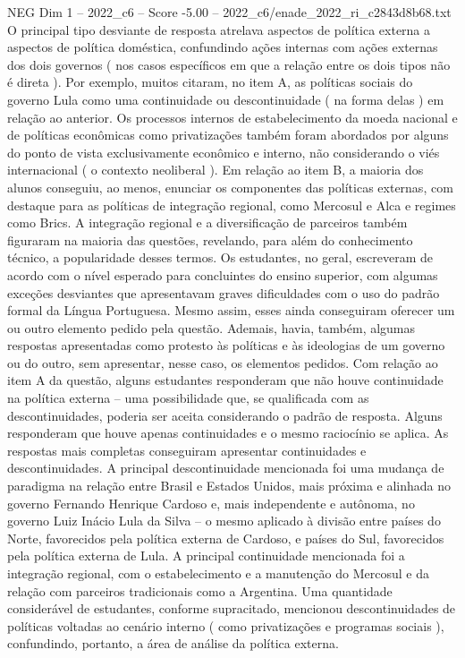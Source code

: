\begin{textsample}{NEG Dim 1 – 2022\_c6 – Score -5.00 – 2022\_c6/enade\_2022\_ri\_c2843d8b68.txt}
O principal tipo desviante de resposta atrelava aspectos de política externa a aspectos de política doméstica, confundindo ações internas com ações externas dos dois governos ( nos casos específicos em que a relação entre os dois tipos não é direta ).
Por exemplo, muitos citaram, no item A, as políticas sociais do governo Lula como uma continuidade ou descontinuidade ( na forma delas ) em relação ao anterior.
Os processos internos de estabelecimento da moeda nacional e de políticas econômicas como privatizações também foram abordados por alguns do ponto de vista exclusivamente econômico e interno, não considerando o viés internacional ( o contexto neoliberal ).
Em relação ao item B, a maioria dos alunos conseguiu, ao menos, enunciar os componentes das políticas externas, com destaque para as políticas de integração regional, como Mercosul e Alca e regimes como Brics.
A integração regional e a diversificação de parceiros também figuraram na maioria das questões, revelando, para além do conhecimento técnico, a popularidade desses termos.
Os estudantes, no geral, escreveram de acordo com o nível esperado para concluintes do ensino superior, com algumas exceções desviantes que apresentavam graves dificuldades com o uso do padrão formal da Língua Portuguesa.
Mesmo assim, esses ainda conseguiram oferecer um ou outro elemento pedido pela questão.
Ademais, havia, também, algumas respostas apresentadas como protesto às políticas e às ideologias de um governo ou do outro, sem apresentar, nesse caso, os elementos pedidos.
Com relação ao item A da questão, alguns estudantes responderam que não houve continuidade na política externa – uma possibilidade que, se qualificada com as descontinuidades, poderia ser aceita considerando o padrão de resposta.
Alguns responderam que houve apenas continuidades e o mesmo raciocínio se aplica.
As respostas mais completas conseguiram apresentar continuidades e descontinuidades.
A principal descontinuidade mencionada foi uma mudança de paradigma na relação entre Brasil e Estados Unidos, mais próxima e alinhada no governo Fernando Henrique Cardoso e, mais independente e autônoma, no governo Luiz Inácio Lula da Silva – o mesmo aplicado à divisão entre países do Norte, favorecidos pela política externa de Cardoso, e países do Sul, favorecidos pela política externa de Lula.
A principal continuidade mencionada foi a integração regional, com o estabelecimento e a manutenção do Mercosul e da relação com parceiros tradicionais como a Argentina.
Uma quantidade considerável de estudantes, conforme supracitado, mencionou descontinuidades de políticas voltadas ao cenário interno ( como privatizações e programas sociais ), confundindo, portanto, a área de análise da política externa.

\end{textsample}
